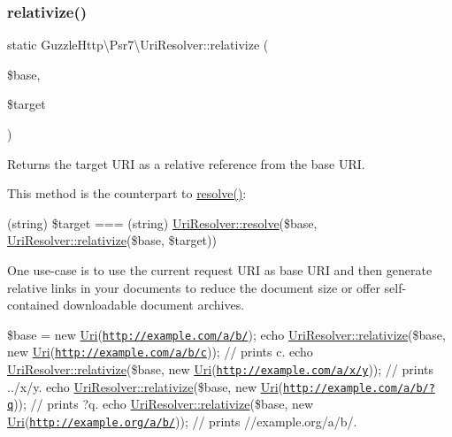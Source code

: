 \subsubsection{\texorpdfstring{relativize()}{relativize()}}
{\footnotesize\ttfamily static Guzzle\+Http\textbackslash{}\+Psr7\textbackslash{}\+Uri\+Resolver\+::relativize (\begin{DoxyParamCaption}\item[{\hyperlink{interfacePsr_1_1Http_1_1Message_1_1UriInterface}{Uri\+Interface}}]{\$base,  }\item[{\hyperlink{interfacePsr_1_1Http_1_1Message_1_1UriInterface}{Uri\+Interface}}]{\$target }\end{DoxyParamCaption})\hspace{0.3cm}{\ttfamily [static]}}

Returns the target U\+RI as a relative reference from the base U\+RI.

This method is the counterpart to \hyperlink{classGuzzleHttp_1_1Psr7_1_1UriResolver_aa92dccd83431979e6adbd2788af77941}{resolve()}\+:

(string) \$target === (string) \hyperlink{classGuzzleHttp_1_1Psr7_1_1UriResolver_aa92dccd83431979e6adbd2788af77941}{Uri\+Resolver\+::resolve}(\$base, \hyperlink{classGuzzleHttp_1_1Psr7_1_1UriResolver_a4e010e1e3e5349f75704445456c549da}{Uri\+Resolver\+::relativize}(\$base, \$target))

One use-\/case is to use the current request U\+RI as base U\+RI and then generate relative links in your documents to reduce the document size or offer self-\/contained downloadable document archives.

\$base = new \hyperlink{classGuzzleHttp_1_1Psr7_1_1Uri}{Uri}(\textquotesingle{}\href{http://example.com/a/b/'}{\tt http\+://example.\+com/a/b/\textquotesingle{}}); echo \hyperlink{classGuzzleHttp_1_1Psr7_1_1UriResolver_a4e010e1e3e5349f75704445456c549da}{Uri\+Resolver\+::relativize}(\$base, new \hyperlink{classGuzzleHttp_1_1Psr7_1_1Uri}{Uri}(\textquotesingle{}\href{http://example.com/a/b/c'}{\tt http\+://example.\+com/a/b/c\textquotesingle{}})); // prints \textquotesingle{}c\textquotesingle{}. echo \hyperlink{classGuzzleHttp_1_1Psr7_1_1UriResolver_a4e010e1e3e5349f75704445456c549da}{Uri\+Resolver\+::relativize}(\$base, new \hyperlink{classGuzzleHttp_1_1Psr7_1_1Uri}{Uri}(\textquotesingle{}\href{http://example.com/a/x/y'}{\tt http\+://example.\+com/a/x/y\textquotesingle{}})); // prints \textquotesingle{}../x/y\textquotesingle{}. echo \hyperlink{classGuzzleHttp_1_1Psr7_1_1UriResolver_a4e010e1e3e5349f75704445456c549da}{Uri\+Resolver\+::relativize}(\$base, new \hyperlink{classGuzzleHttp_1_1Psr7_1_1Uri}{Uri}(\textquotesingle{}\href{http://example.com/a/b/?q'}{\tt http\+://example.\+com/a/b/?q\textquotesingle{}})); // prints \textquotesingle{}?q\textquotesingle{}. echo \hyperlink{classGuzzleHttp_1_1Psr7_1_1UriResolver_a4e010e1e3e5349f75704445456c549da}{Uri\+Resolver\+::relativize}(\$base, new \hyperlink{classGuzzleHttp_1_1Psr7_1_1Uri}{Uri}(\textquotesingle{}\href{http://example.org/a/b/'}{\tt http\+://example.\+org/a/b/\textquotesingle{}})); // prints \textquotesingle{}//example.org/a/b/\textquotesingle{}.

